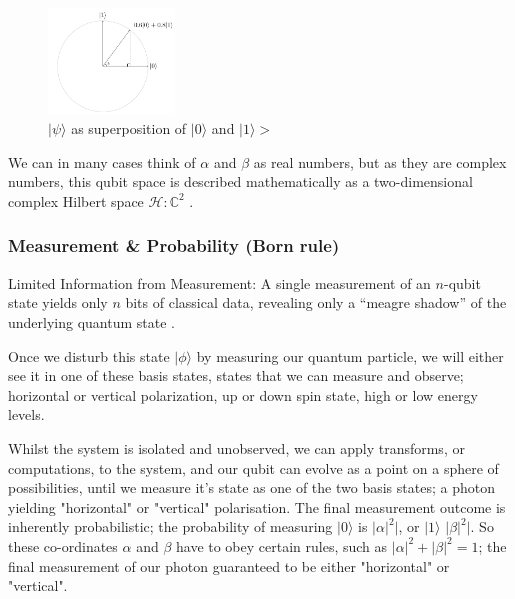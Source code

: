 \begin{figure}[ht] 
	\begin{adjustbox}{center}
		\includegraphics[width=0.3\textwidth, inner]{figures/unit-vector-2-d-hilbert-state.png}
	\end{adjustbox}
	\caption{$\lvert\psi\rangle$ as superposition of $\lvert0\rangle$ and $\lvert1\rangle>$ }
	\label{fig:2d_hilbert_space}
\end{figure}

We can in many cases think of $\alpha$ and $\beta$ as real numbers, but as they are complex numbers, 
this qubit space is described mathematically as a two-dimensional complex 
Hilbert space $\mathcal{H} : \mathbb{C}^2$ \cite{Preskill:2023} \cite{Nielsen:2010}.


\subsubsection{Measurement \& Probability (Born rule)}

Limited Information from Measurement: A single measurement of an $n$-qubit state yields only $n$ bits of classical data, 
revealing only a \enquote{meagre shadow} of the underlying quantum state \cite{Preskill:2023}.


Once we disturb this state $\lvert\phi\rangle$ by measuring our quantum particle, 
we will either see it in one of these basis states, states that we can measure and observe; 
horizontal or vertical polarization, up or down spin state, high or low energy levels.  

Whilst the system is isolated and unobserved, we can apply transforms, or computations, to the system,
and our qubit can evolve as a point on a sphere of possibilities, until we measure it's state as one of the two basis states;
a photon yielding "horizontal" or "vertical" polarisation.  
The final measurement outcome is inherently probabilistic; 
the probability of measuring $\lvert0\rangle$ is $\lvert\alpha\lvert^2|$, or $\lvert1\rangle$ $\lvert\beta\lvert^2|$.
So these co-ordinates $\alpha$ and $\beta$ have to obey certain rules, 
such as $\lvert\alpha\lvert^2 + \lvert\beta\lvert^2 = 1$; 
the final measurement of our photon guaranteed to be either "horizontal" or "vertical".

